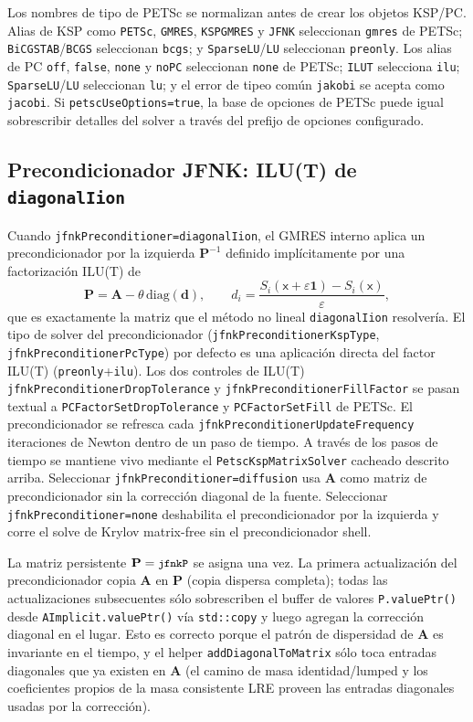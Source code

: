 \documentclass[11pt,a4paper]{article}
\newcommand{\code}[1]{\texttt{\small #1}}
\newcommand{\Aimp}{\mathbf{A}}
\begin{document}
Los nombres de tipo de PETSc se normalizan antes de crear los objetos KSP/PC. Alias de KSP
como \code{PETSc}, \code{GMRES}, \code{KSPGMRES} y \code{JFNK} seleccionan \code{gmres} de
PETSc; \code{BiCGSTAB}/\code{BCGS} seleccionan \code{bcgs}; y \code{SparseLU}/\code{LU}
seleccionan \code{preonly}. Los alias de PC \code{off}, \code{false}, \code{none} y
\code{noPC} seleccionan \code{none} de PETSc; \code{ILUT} selecciona \code{ilu};
\code{SparseLU}/\code{LU} seleccionan \code{lu}; y el error de tipeo común \code{jakobi} se
acepta como \code{jacobi}. Si \code{petscUseOptions=true}, la base de opciones de PETSc puede
igual sobrescribir detalles del solver a través del prefijo de opciones configurado.

\subsection{Precondicionador JFNK: ILU(T) de \texorpdfstring{\code{diagonalIion}}{diagonalIion}}

Cuando \code{jfnkPreconditioner=diagonalIion}, el GMRES interno aplica un precondicionador
por la izquierda $\mathbf{P}^{-1}$ definido implícitamente por una factorización ILU(T) de
\begin{equation}
  \mathbf{P}
  =
  \Aimp - \theta\,\mathrm{diag}(\mathbf{d}),
  \qquad
  d_i =
  \frac{S_i(\mathsf{x}+\varepsilon\mathbf{1})-S_i(\mathsf{x})}{\varepsilon},
  \label{eq:jfnk-pc-matrix}
\end{equation}
que es exactamente la matriz que el método no lineal \code{diagonalIion} resolvería. El tipo
de solver del precondicionador (\code{jfnkPreconditionerKspType},
\code{jfnkPreconditionerPcType}) por defecto es una aplicación directa del factor ILU(T)
(\code{preonly}+\code{ilu}). Los dos controles de ILU(T)
\code{jfnkPreconditionerDropTolerance} y \code{jfnkPreconditionerFillFactor} se pasan textual
a \code{PCFactorSetDropTolerance} y \code{PCFactorSetFill} de PETSc. El precondicionador se
refresca cada \code{jfnkPreconditionerUpdateFrequency} iteraciones de Newton dentro de un
paso de tiempo. A través de los pasos de tiempo se mantiene vivo mediante el
\code{PetscKspMatrixSolver} cacheado descrito arriba. Seleccionar
\code{jfnkPreconditioner=diffusion} usa $\Aimp$ como matriz de precondicionador sin la
corrección diagonal de la fuente. Seleccionar \code{jfnkPreconditioner=none} deshabilita el
precondicionador por la izquierda y corre el solve de Krylov matrix-free sin el
precondicionador shell.

La matriz persistente $\mathbf{P}=\code{jfnkP}$ se asigna una vez. La primera actualización
del precondicionador copia $\Aimp$ en $\mathbf{P}$ (copia dispersa completa); todas las
actualizaciones subsecuentes sólo sobrescriben el buffer de valores \code{P.valuePtr()} desde
\code{AImplicit.valuePtr()} vía \code{std::copy} y luego agregan la corrección diagonal en el
lugar. Esto es correcto porque el patrón de dispersidad de $\Aimp$ es invariante en el tiempo,
y el helper \code{addDiagonalToMatrix} sólo toca entradas diagonales que ya existen en $\Aimp$
(el camino de masa identidad/lumped y los coeficientes propios de la masa consistente LRE
proveen las entradas diagonales usadas por la corrección).
\end{document}
